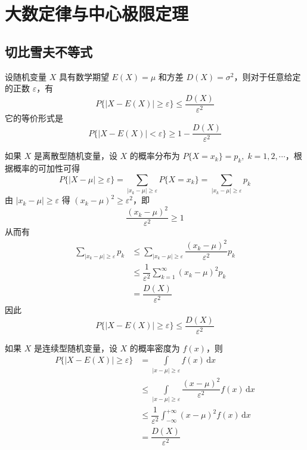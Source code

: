 \chapter{大数定律与中心极限定理}

\section{切比雪夫不等式}

\begin{theorem}[（切比雪夫不等式）]
    设随机变量 $X$ 具有数学期望 $E(X)=\mu$ 和方差 $D(X) = \sigma^2$，则对于任意给定的正数 $\varepsilon$，有
    $$
    P\{ |X-E(X)| \geqslant \varepsilon \} \leqslant \dfrac{D(X)}{\varepsilon^2}
    $$
    它的等价形式是
    $$
    P\{ |X-E(X)| < \varepsilon \} \geqslant 1 - \dfrac{D(X)}{\varepsilon^2}
    $$
\end{theorem}

\begin{myproof}
    如果 $X$ 是离散型随机变量，设 $X$ 的概率分布为 $P\{X = x_k\} = p_k, \; k=1,2,\cdots$，根据概率的可加性可得
    $$
    P\{ |X-\mu| \geqslant \varepsilon \} = \sum_{|x_k-\mu| \geqslant \varepsilon} P\{ X=x_k \} = \sum_{|x_k-\mu| \geqslant \varepsilon} p_k
    $$
    由 $|x_k-\mu| \geqslant \varepsilon$ 得 $(x_k-\mu)^2 \geqslant \varepsilon^2$，即
    $$
    \dfrac{(x_k-\mu)^2}{\varepsilon^2} \geqslant 1
    $$
    从而有
    $$
    \begin{aligned}
        \sum_{|x_k-\mu| \geqslant \varepsilon} p_k & \leqslant \sum_{|x_k-\mu| \geqslant \varepsilon} \dfrac{(x_k-\mu)^2}{\varepsilon^2} p_k \\
        & \leqslant \dfrac{1}{\varepsilon^2} \sum_{k=1}^{\infty} (x_k-\mu)^2 p_k \\
        &= \dfrac{D(X)}{\varepsilon^2}
    \end{aligned}
    $$
    因此
    $$
    P\{ |X-E(X)| \geqslant \varepsilon \} \leqslant \dfrac{D(X)}{\varepsilon^2}
    $$

    如果 $X$ 是连续型随机变量，设 $X$ 的概率密度为 $f(x)$，则
    $$
    \begin{aligned}
        P\{ |X-E(X)| \geqslant \varepsilon \} &= \underset{|x-\mu| \geqslant \varepsilon}{\int} f(x) \, \text{d}x \\
         & \leqslant \underset{|x-\mu| \geqslant \varepsilon}{\int} \dfrac{(x-\mu)^2}{\varepsilon^2} f(x) \, \text{d}x \\
         & \leqslant \dfrac{1}{\varepsilon^2} \int_{-\infty}^{+\infty} (x-\mu)^2 f(x) \, \text{d}x \\
         &= \dfrac{D(X)}{\varepsilon^2}
    \end{aligned}
    $$
\end{myproof}

